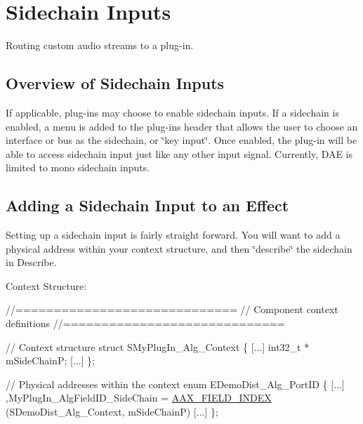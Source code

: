 \hypertarget{a00338}{}\section{Sidechain Inputs}
\label{a00338}
Routing custom audio streams to a plug-\/in. 

\hypertarget{a00338_additionalFeatures_Sidechain_overview}{}\subsection{Overview of Sidechain Inputs}\label{a00338_additionalFeatures_Sidechain_overview}
If applicable, plug-\/ins may choose to enable sidechain inputs. If a sidechain is enabled, a menu is added to the plug-\/in\textquotesingle{}s header that allows the user to choose an interface or bus as the sidechain, or \char`\"{}key input\char`\"{}. Once enabled, the plug-\/in will be able to access sidechain input just like any other input signal. Currently, D\+A\+E is limited to mono sidechain inputs.\hypertarget{a00338_additionalFeatures_Sidechain_adding}{}\subsection{Adding a Sidechain Input to an Effect}\label{a00338_additionalFeatures_Sidechain_adding}
Setting up a sidechain input is fairly straight forward. You will want to add a physical address within your context structure, and then \char`\"{}describe\char`\"{} the sidechain in Describe.

Context Structure\+:


\begin{DoxyCode}
\textcolor{comment}{//=============================}
\textcolor{comment}{// Component context definitions}
\textcolor{comment}{//=============================}

\textcolor{comment}{// Context structure}
\textcolor{keyword}{struct }SMyPlugIn\_Alg\_Context
\{
   [...]
   int32\_t  * mSideChainP;
   [...]
\};

\textcolor{comment}{// Physical addresses within the context}
\textcolor{keyword}{enum} EDemoDist\_Alg\_PortID
\{
    [...]
    ,MyPlugIn\_AlgFieldID\_SideChain  = \hyperlink{a00149_acf807247ecd6e5899dc9dc31644e9a1d}{AAX\_FIELD\_INDEX} (SDemoDist\_Alg\_Context, mSideChainP)
    [...]
\};
\end{DoxyCode}


